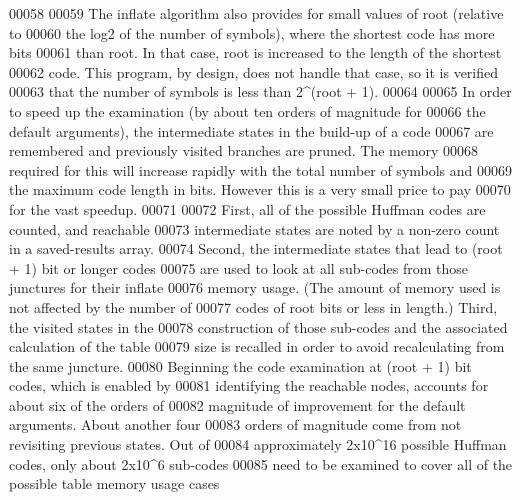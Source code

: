 \begin{DoxyCode}
00058 \textcolor{comment}{}
00059 \textcolor{comment}{   The inflate algorithm also provides for small values of root (relative to}
00060 \textcolor{comment}{   the log2 of the number of symbols), where the shortest code has more bits}
00061 \textcolor{comment}{   than root.  In that case, root is increased to the length of the shortest}
00062 \textcolor{comment}{   code.  This program, by design, does not handle that case, so it is verified}
00063 \textcolor{comment}{   that the number of symbols is less than 2^(root + 1).}
00064 \textcolor{comment}{}
00065 \textcolor{comment}{   In order to speed up the examination (by about ten orders of magnitude for}
00066 \textcolor{comment}{   the default arguments), the intermediate states in the build-up of a code}
00067 \textcolor{comment}{   are remembered and previously visited branches are pruned.  The memory}
00068 \textcolor{comment}{   required for this will increase rapidly with the total number of symbols and}
00069 \textcolor{comment}{   the maximum code length in bits.  However this is a very small price to pay}
00070 \textcolor{comment}{   for the vast speedup.}
00071 \textcolor{comment}{}
00072 \textcolor{comment}{   First, all of the possible Huffman codes are counted, and reachable}
00073 \textcolor{comment}{   intermediate states are noted by a non-zero count in a saved-results array.}
00074 \textcolor{comment}{   Second, the intermediate states that lead to (root + 1) bit or longer codes}
00075 \textcolor{comment}{   are used to look at all sub-codes from those junctures for their inflate}
00076 \textcolor{comment}{   memory usage.  (The amount of memory used is not affected by the number of}
00077 \textcolor{comment}{   codes of root bits or less in length.)  Third, the visited states in the}
00078 \textcolor{comment}{   construction of those sub-codes and the associated calculation of the table}
00079 \textcolor{comment}{   size is recalled in order to avoid recalculating from the same juncture.}
00080 \textcolor{comment}{   Beginning the code examination at (root + 1) bit codes, which is enabled by}
00081 \textcolor{comment}{   identifying the reachable nodes, accounts for about six of the orders of}
00082 \textcolor{comment}{   magnitude of improvement for the default arguments.  About another four}
00083 \textcolor{comment}{   orders of magnitude come from not revisiting previous states.  Out of}
00084 \textcolor{comment}{   approximately 2x10^16 possible Huffman codes, only about 2x10^6 sub-codes}
00085 \textcolor{comment}{   need to be examined to cover all of the possible table memory usage cases}

\end{DoxyCode}
